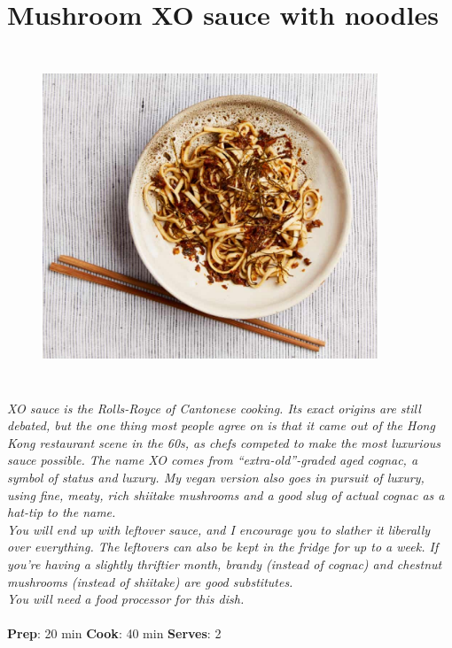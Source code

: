 \documentclass{book}
\begin{document}
\section{Mushroom XO sauce with noodles}
\begin{figure}
\centering\includegraphics[width=10cm,height=10cm,keepaspectratio]{Recipe_Pictures/Mushroom_XO_sauce_with_noodles.png}
\end{figure}
\emph{XO sauce is the Rolls-Royce of Cantonese cooking. Its exact origins are still debated, but the one thing most people agree on is that it came out of the Hong Kong restaurant scene in the 60s, as chefs competed to make the most luxurious sauce possible. The name XO comes from “extra-old”-graded aged cognac, a symbol of status and luxury. My vegan version also goes in pursuit of luxury, using fine, meaty, rich shiitake mushrooms and a good slug of actual cognac as a hat-tip to the name.\\ 
You will end up with leftover sauce, and I encourage you to slather it liberally over everything. The leftovers can also be kept in the fridge for up to a week. If you’re having a slightly thriftier month, brandy (instead of cognac) and chestnut mushrooms (instead of shiitake) are good substitutes.\\ 
You will need a food processor for this dish.}\\\\ 
\textbf{Prep}: 20 min
\textbf{Cook}: 40 min
\textbf{Serves}: 2
\end{document}
